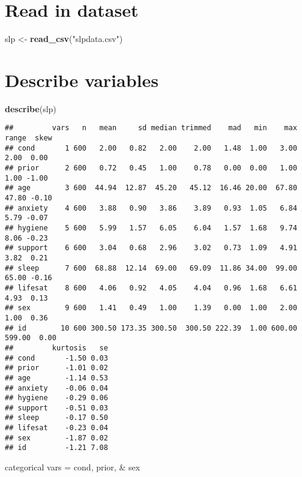 \documentclass[]{article}
\newenvironment{Shaded}{\begin{snugshade}}{\end{snugshade}}
\newcommand{\KeywordTok}[1]{\textcolor[rgb]{0.13,0.29,0.53}{\textbf{#1}}}
\newcommand{\StringTok}[1]{\textcolor[rgb]{0.31,0.60,0.02}{#1}}
\newcommand{\NormalTok}[1]{#1}
\begin{document}
\section{Read in dataset}\label{read-in-dataset}

\begin{Shaded}
\begin{Highlighting}[]
\NormalTok{slp <-}\StringTok{ }\KeywordTok{read_csv}\NormalTok{(}\StringTok{"slpdata.csv"}\NormalTok{)}
\end{Highlighting}
\end{Shaded}

\section{Describe variables}\label{describe-variables}

\begin{Shaded}
\begin{Highlighting}[]
\KeywordTok{describe}\NormalTok{(slp)}
\end{Highlighting}
\end{Shaded}

\begin{verbatim}
##         vars   n   mean     sd median trimmed    mad   min    max  range  skew
## cond       1 600   2.00   0.82   2.00    2.00   1.48  1.00   3.00   2.00  0.00
## prior      2 600   0.72   0.45   1.00    0.78   0.00  0.00   1.00   1.00 -1.00
## age        3 600  44.94  12.87  45.20   45.12  16.46 20.00  67.80  47.80 -0.10
## anxiety    4 600   3.88   0.90   3.86    3.89   0.93  1.05   6.84   5.79 -0.07
## hygiene    5 600   5.99   1.57   6.05    6.04   1.57  1.68   9.74   8.06 -0.23
## support    6 600   3.04   0.68   2.96    3.02   0.73  1.09   4.91   3.82  0.21
## sleep      7 600  68.88  12.14  69.00   69.09  11.86 34.00  99.00  65.00 -0.16
## lifesat    8 600   4.06   0.92   4.05    4.04   0.96  1.68   6.61   4.93  0.13
## sex        9 600   1.41   0.49   1.00    1.39   0.00  1.00   2.00   1.00  0.36
## id        10 600 300.50 173.35 300.50  300.50 222.39  1.00 600.00 599.00  0.00
##         kurtosis   se
## cond       -1.50 0.03
## prior      -1.01 0.02
## age        -1.14 0.53
## anxiety    -0.06 0.04
## hygiene    -0.29 0.06
## support    -0.51 0.03
## sleep      -0.17 0.50
## lifesat    -0.23 0.04
## sex        -1.87 0.02
## id         -1.21 7.08
\end{verbatim}

categorical vars = cond, prior, \& sex
\end{document}
